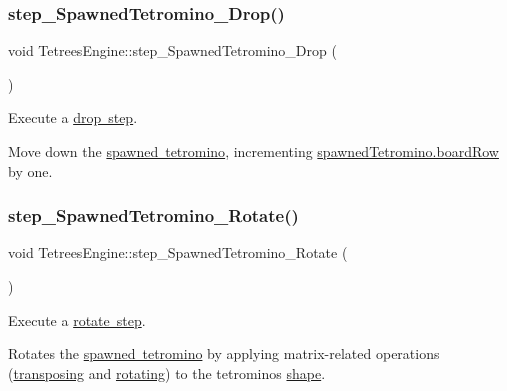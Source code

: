 \subsubsection{\texorpdfstring{step\+\_\+\+Spawned\+Tetromino\+\_\+\+Drop()}{step\_SpawnedTetromino\_Drop()}}
{\footnotesize\ttfamily void Tetrees\+Engine\+::step\+\_\+\+Spawned\+Tetromino\+\_\+\+Drop (\begin{DoxyParamCaption}{ }\end{DoxyParamCaption})\hspace{0.3cm}{\ttfamily [private]}}



Execute a \mbox{\hyperlink{TetreesDefs_8hpp_a4d5a793092a473f85b4c1f7faf62afeda6df5f4c213c30a4ad91af7a5d10daa8e}{drop step}}. 

Move down the \mbox{\hyperlink{classTetreesEngine_a26435ee2f02d9ba70d9e359745114f6e}{spawned tetromino}}, incrementing \mbox{\hyperlink{structpiece__t}{spawned\+Tetromino.board\+Row}} by one. \mbox{\label{classTetreesEngine_a90d1d65e12fb37850962305d8bc3b7a3}} 
\subsubsection{\texorpdfstring{step\+\_\+\+Spawned\+Tetromino\+\_\+\+Rotate()}{step\_SpawnedTetromino\_Rotate()}}
{\footnotesize\ttfamily void Tetrees\+Engine\+::step\+\_\+\+Spawned\+Tetromino\+\_\+\+Rotate (\begin{DoxyParamCaption}{ }\end{DoxyParamCaption})\hspace{0.3cm}{\ttfamily [private]}}



Execute a \mbox{\hyperlink{TetreesDefs_8hpp_a4d5a793092a473f85b4c1f7faf62afeda22387bf41fe41a5ac2b7b74ab8f5c342}{rotate step}}. 

Rotates the \mbox{\hyperlink{classTetreesEngine_a26435ee2f02d9ba70d9e359745114f6e}{spawned tetromino}} by applying matrix-\/related operations (\mbox{\hyperlink{classMatrix2D_a788abe5e1fbd6a1fbd0d445aca4f8300}{transposing}} and \mbox{\hyperlink{classMatrix2D_a2845ff86d7f24ccd338b42b2a9cbe017}{rotating}}) to the tetromino\textquotesingle{}s \mbox{\hyperlink{structpiece__t_a3c8f9c2e51c6bab728e564143c439746}{shape}}. \mbox{\label{classTetreesEngine_ab7169a28a06a867ada69a01a580fb2ad}} 
